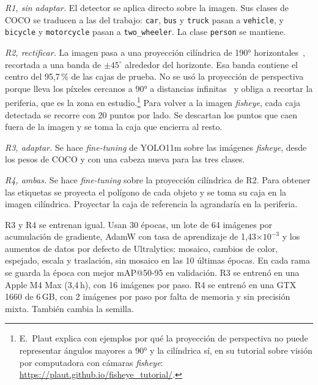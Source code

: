 \documentclass[conference]{IEEEtran}
\begin{document}
\textit{R1, sin adaptar.} El detector se aplica directo sobre la imagen. Sus clases de COCO se traducen a las del trabajo: \texttt{car}, \texttt{bus} y \texttt{truck} pasan a \texttt{vehicle}, y \texttt{bicycle} y \texttt{motorcycle} pasan a \texttt{two\_wheeler}. La clase \texttt{person} se mantiene.

\textit{R2, rectificar.} La imagen pasa a una proyección cilíndrica de 190° horizontales~\cite{plaut2021cylindrical}, recortada a una banda de $\pm45^\circ$ alrededor del horizonte. Esa banda contiene el centro del 95,7\,\% de las cajas de prueba. No se usó la proyección de perspectiva porque lleva los píxeles cercanos a 90° a distancias infinitas~\cite{plaut2021cylindrical} y obliga a recortar la periferia, que es la zona en estudio.\footnote{E.~Plaut explica con ejemplos por qué la proyección de perspectiva no puede representar ángulos mayores a 90° y la cilíndrica sí, en su tutorial sobre visión por computadora con cámaras \textit{fisheye}: \url{https://plaut.github.io/fisheye_tutorial/}.} Para volver a la imagen \textit{fisheye}, cada caja detectada se recorre con 20 puntos por lado. Se descartan los puntos que caen fuera de la imagen y se toma la caja que encierra al resto.

\textit{R3, adaptar.} Se hace \textit{fine-tuning} de YOLO11m sobre las imágenes \textit{fisheye}, desde los pesos de COCO y con una cabeza nueva para las tres clases.

\textit{R4, ambas.} Se hace \textit{fine-tuning} sobre la proyección cilíndrica de R2. Para obtener las etiquetas se proyecta el polígono de cada objeto y se toma su caja en la imagen cilíndrica. Proyectar la caja de referencia la agrandaría en la periferia.

R3 y R4 se entrenan igual. Usan 30 épocas, un lote de 64 imágenes por acumulación de gradiente, AdamW con tasa de aprendizaje de 1,43$\times10^{-3}$ y los aumentos de datos por defecto de Ultralytics: mosaico, cambios de color, espejado, escala y traslación, sin mosaico en las 10 últimas épocas. En cada rama se guarda la época con mejor mAP@50-95 en validación. R3 se entrenó en una Apple M4 Max (3,4\,h), con 16 imágenes por paso. R4 se entrenó en una GTX 1660 de 6\,GB, con 2 imágenes por paso por falta de memoria y sin precisión mixta. También cambia la semilla.
\end{document}
